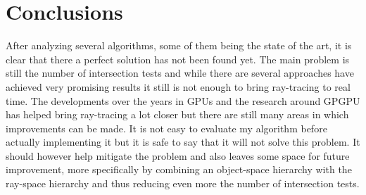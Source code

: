 \documentclass{llncs}
\begin{document}
%
\section{Conclusions}
%

After analyzing several algorithms, some of them being the state of the art, it is clear that there a perfect solution has not been found yet. The main problem is still the number of intersection tests and while there are several approaches have achieved very promising results it still is not enough to bring ray-tracing to real time. The developments over the years in GPUs and the research around GPGPU has helped bring ray-tracing a lot closer but there are still many areas in which improvements can be made.
It is not easy to evaluate my algorithm before actually implementing it but it is safe to say that it will not solve this problem. It should however help mitigate the problem and also leaves some space for future improvement, more specifically by combining an object-space hierarchy with the ray-space hierarchy and thus reducing even more the number of intersection tests.

%
%



\end{document}
